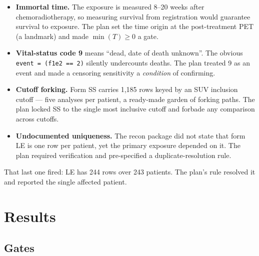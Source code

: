 \documentclass[11pt,a4paper]{article}
\begin{document}
\begin{itemize}[leftmargin=1.3em,itemsep=2pt]
\item \textbf{Immortal time.} The exposure is measured 8--20 weeks after chemoradiotherapy, so
      measuring survival from registration would guarantee survival to exposure. The plan set the
      time origin at the post-treatment PET (a landmark) and made $\min(T) \geq 0$ a gate.
\item \textbf{Vital-status code 9} means ``dead, date of death unknown''. The obvious
      \texttt{event = (f1e2 == 2)} silently undercounts deaths. The plan treated 9 as an event and
      made a censoring sensitivity a \emph{condition} of confirming.
\item \textbf{Cutoff forking.} Form SS carries 1{,}185 rows keyed by an SUV inclusion cutoff ---
      five analyses per patient, a ready-made garden of forking paths. The plan locked SS to the
      single most inclusive cutoff and forbade any comparison across cutoffs.
\item \textbf{Undocumented uniqueness.} The recon package did not state that form LE is one row
      per patient, yet the primary exposure depended on it. The plan required verification and
      pre-specified a duplicate-resolution rule.
\end{itemize}

That last one fired: LE has 244 rows over 243 patients. The plan's rule resolved it and reported
the single affected patient.

\section{Results}

\subsection{Gates}
\end{document}
